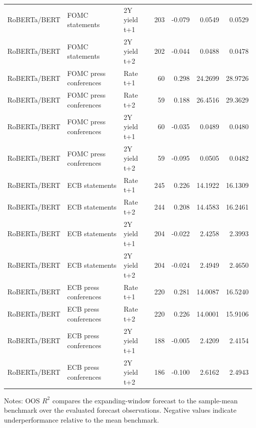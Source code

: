 \begin{table}[H]
\begin{threeparttable}
{\begin{tabular}{lllrrrr}
RoBERTa\slash BERT & FOMC statements & 2Y yield t+1 & 203 & -0.079 & 0.0549 & 0.0529 \\
RoBERTa\slash BERT & FOMC statements & 2Y yield t+2 & 202 & -0.044 & 0.0488 & 0.0478 \\
RoBERTa\slash BERT & FOMC press conferences & Rate t+1 & 60 & 0.298 & 24.2699 & 28.9726 \\
RoBERTa\slash BERT & FOMC press conferences & Rate t+2 & 59 & 0.188 & 26.4516 & 29.3629 \\
RoBERTa\slash BERT & FOMC press conferences & 2Y yield t+1 & 60 & -0.035 & 0.0489 & 0.0480 \\
RoBERTa\slash BERT & FOMC press conferences & 2Y yield t+2 & 59 & -0.095 & 0.0505 & 0.0482 \\
RoBERTa\slash BERT & ECB statements & Rate t+1 & 245 & 0.226 & 14.1922 & 16.1309 \\
RoBERTa\slash BERT & ECB statements & Rate t+2 & 244 & 0.208 & 14.4583 & 16.2461 \\
RoBERTa\slash BERT & ECB statements & 2Y yield t+1 & 204 & -0.022 & 2.4258 & 2.3993 \\
RoBERTa\slash BERT & ECB statements & 2Y yield t+2 & 204 & -0.024 & 2.4949 & 2.4650 \\
RoBERTa\slash BERT & ECB press conferences & Rate t+1 & 220 & 0.281 & 14.0087 & 16.5240 \\
RoBERTa\slash BERT & ECB press conferences & Rate t+2 & 220 & 0.226 & 14.0001 & 15.9106 \\
RoBERTa\slash BERT & ECB press conferences & 2Y yield t+1 & 188 & -0.005 & 2.4209 & 2.4154 \\
RoBERTa\slash BERT & ECB press conferences & 2Y yield t+2 & 186 & -0.100 & 2.6162 & 2.4943 \\
\bottomrule
\end{tabular}
}
\begin{tablenotes}
\footnotesize
\item Notes: OOS $R^2$ compares the expanding-window forecast to the sample-mean benchmark over the evaluated forecast observations. Negative values indicate underperformance relative to the mean benchmark.
\end{tablenotes}
\end{threeparttable}
\end{table}

